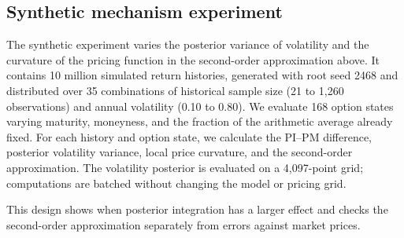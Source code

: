 \subsection{Synthetic mechanism experiment}

The synthetic experiment varies the posterior variance of volatility and the curvature of the pricing function in the second-order approximation above. It contains 10 million simulated return histories, generated with root seed 2468 and distributed over 35 combinations of historical sample size (21 to 1,260 observations) and annual volatility (0.10 to 0.80). We evaluate 168 option states varying maturity, moneyness, and the fraction of the arithmetic average already fixed. For each history and option state, we calculate the PI--PM difference, posterior volatility variance, local price curvature, and the second-order approximation. The volatility posterior is evaluated on a 4,097-point grid; computations are batched without changing the model or pricing grid.

This design shows when posterior integration has a larger effect and checks the second-order approximation separately from errors against market prices.
